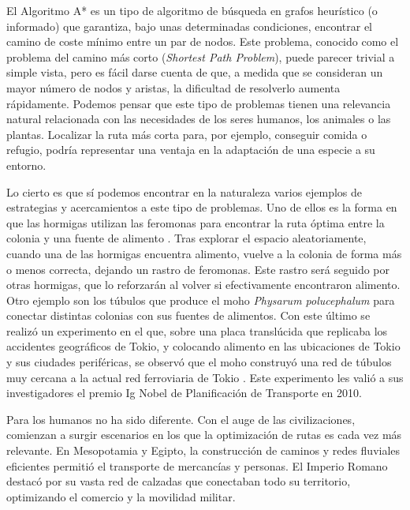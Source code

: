 \documentclass[a4paper,12pt]{article}
\begin{document}
El Algoritmo A* es un tipo de algoritmo de búsqueda en grafos heurístico (o informado) que garantiza, bajo unas determinadas condiciones, encontrar el camino de coste mínimo entre un par de nodos. Este problema, conocido como el problema del camino más corto (\textit{Shortest Path Problem}), puede parecer trivial a simple vista, pero es fácil darse cuenta de que, a medida que se consideran un mayor número de nodos y aristas, la dificultad de resolverlo aumenta rápidamente. Podemos pensar que este tipo de problemas tienen una relevancia natural relacionada con las necesidades de los seres humanos, los animales o las plantas. Localizar la ruta más corta para, por ejemplo, conseguir comida o refugio, podría representar una ventaja en la adaptación de una especie a su entorno.

Lo cierto es que sí podemos encontrar en la naturaleza varios ejemplos de estrategias y acercamientos a este tipo de problemas. Uno de ellos es la forma en que las hormigas utilizan las feromonas para encontrar la ruta óptima entre la colonia y una fuente de alimento \cite{colorni1991distributed}. Tras explorar el espacio aleatoriamente, cuando una de las hormigas encuentra alimento, vuelve a la colonia de forma más o menos correcta, dejando un rastro de feromonas. Este rastro será seguido por otras hormigas, que lo reforzarán al volver si efectivamente encontraron alimento. Otro ejemplo son los túbulos que produce el moho \textit{Physarum polucephalum} para conectar distintas colonias con sus fuentes de alimentos. Con este último se realizó un experimento en el que, sobre una placa translúcida que replicaba los accidentes geográficos de Tokio, y colocando alimento en las ubicaciones de Tokio y sus ciudades periféricas, se observó que el moho construyó una red de túbulos muy cercana a la actual red ferroviaria de Tokio \cite{tero2010rules}. Este experimento les valió a sus investigadores el premio Ig Nobel de Planificación de Transporte en 2010.

Para los humanos no ha sido diferente. Con el auge de las civilizaciones, comienzan a surgir escenarios en los que la optimización de rutas es cada vez más relevante. En Mesopotamia y Egipto, la construcción de caminos y redes fluviales eficientes permitió el transporte de mercancías y personas. El Imperio Romano destacó por su vasta red de calzadas que conectaban todo su territorio, optimizando el comercio y la movilidad militar.
\end{document}
